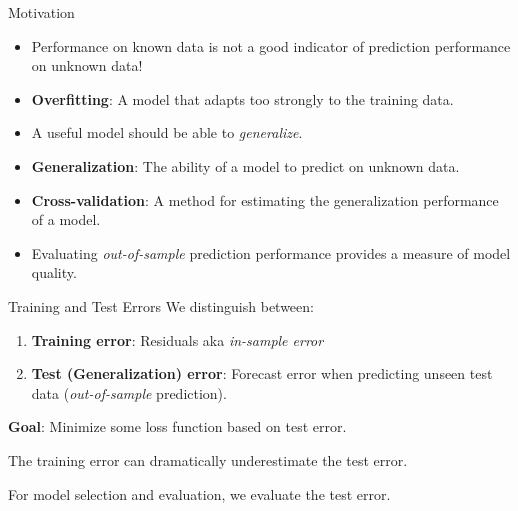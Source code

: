\documentclass[11pt]{beamer}
\begin{document}
\begin{frame}{Motivation}
    \begin{itemize}
        \item Performance on known data is not a good indicator of prediction performance on unknown data!
        \item \textbf{Overfitting}: A model that adapts too strongly to the training data.
        \item A useful model should be able to \textit{generalize}.
        \item \textbf{Generalization}: The ability of a model to predict on unknown data.
        \item \textbf{Cross-validation}: A method for estimating the generalization performance of a model.
        \item Evaluating \textit{out-of-sample} prediction performance provides a measure of model quality.
    \end{itemize}

\end{frame}

\begin{frame}{Training and Test Errors}
    We distinguish between:
    \begin{enumerate}
        \item \textbf{Training error}: Residuals aka \textit{in-sample error}
        \item \textbf{Test (Generalization) error}: Forecast error when predicting unseen test data (\textit{out-of-sample} prediction).
    \end{enumerate}
    \medskip

    \textbf{Goal}: Minimize some loss function based on test error.
    \medskip

    The training error can dramatically underestimate the test error.
    \medskip

    For model selection and evaluation, we evaluate the test error.
\end{frame}
\end{document}
